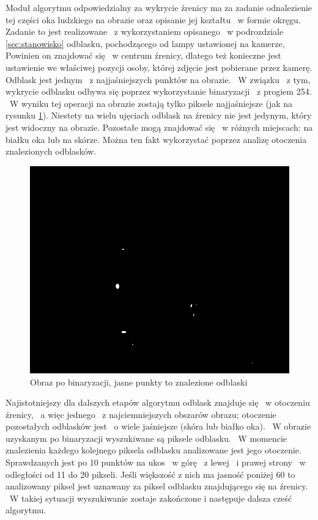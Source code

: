Moduł algorytmu odpowiedzialny za wykrycie źrenicy ma za zadanie odnalezienie tej części oka ludzkiego na obrazie oraz opisanie jej kształtu ~w formie okręgu. Zadanie to jest realizowane ~z wykorzystaniem opisanego ~w podrozdziale \ref{sec:stanowisko} odblasku, pochodzącego od lampy ustawionej na kamerze, Powinien on znajdować się ~w centrum źrenicy, dlatego też konieczne jest ustawienie we właściwej pozycji osoby, której zdjęcie jest pobierane przez kamerę. Odblask jest jednym ~z najjaśniejszych punktów na obrazie. ~W związku ~z tym, wykrycie odblasku odbywa się poprzez wykorzystanie binaryzacji ~z progiem 254. ~W wyniku tej operacji na obrazie zostają tylko piksele najjaśniejsze (jak na rysunku \ref{fig:binaryzacja}). Niestety na wielu ujęciach odblask na źrenicy nie jest jedynym, który jest widoczny na obrazie. Pozostałe mogą znajdować się ~w różnych miejscach: na białku oka lub na skórze. Można ten fakt wykorzystać poprzez analizę otoczenia znalezionych odblasków. 

\begin{figure}
\begin{center}
\includegraphics[scale=0.5]{binaryzacja.jpg}
\caption{Obraz po binaryzacji, jasne punkty to znalezione odblaski}
\label{fig:binaryzacja}
\end{center}
\end{figure}

Najistotniejszy dla dalszych etapów algorytmu odblask znajduje się ~w otoczeniu źrenicy, ~a więc jednego ~z najciemniejszych obszarów obrazu; otoczenie pozostałych odblasków jest ~o wiele jaśniejsze (skóra lub białko oka). ~W obrazie uzyskanym po binaryzacji wyszukiwane są piksele odblasku. ~W momencie znalezienia każdego kolejnego piksela odblasku analizowane jest jego otoczenie. Sprawdzanych jest po 10 punktów na ukos ~w górę ~z lewej ~i prawej strony ~w odległości od 11 do 20 pikseli. Jeśli większość z nich ma jasność poniżej 60 to analizowany piksel jest uznawany za piksel odblasku znajdującego się na źrenicy. ~W takiej sytuacji wyszukiwanie zostaje zakończone i następuje dalsza cześć algorytmu.

